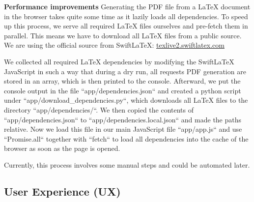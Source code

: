 \textbf{Performance improvements}
Generating the PDF file from a LaTeX document in the browser takes quite some time as it lazily loads all dependencies.
To speed up this process, we serve all required LaTeX files ourselves and pre-fetch them in parallel.
This means we have to download all LaTeX files from a public source. We are using the official source from SwiftLaTeX:
\href{https://texlive2.swiftlatex.com/}{texlive2.swiftlatex.com}

We collected all required LaTeX dependencies by modifying the SwiftLaTeX JavaScript in such a way that during a dry run,
all requests PDF generation are stored in an array, which is then printed to the console.
Afterward, we put the console output in the file ``app/dependencies.json`` and created a python script under ``app/download\_dependencies.py``,
which downloads all LaTeX files to the directory ``app/dependencies/``.
We then copied the contents of ``app/dependencies.json`` to ``app/dependencies.local.json`` and made the paths relative.
Now we load this file in our main JavaScript file ``app/app.js`` and use ``Promise.all`` together with ``fetch`` to load
all dependencies into the cache of the browser as soon as the page is opened.

Currently, this process involves some manual steps and could be automated later.

\subsection{User Experience (UX)}\label{subsec:ux}
